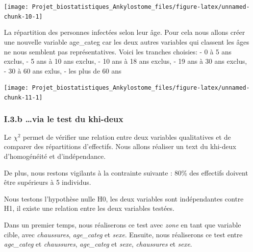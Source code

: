 \documentclass[
]{article}
\begin{document}
\begin{center}\texttt{[image: Projet\_biostatistiques\_Ankylostome\_files/figure-latex/unnamed-chunk-10-1]} \end{center}

La répartition des personnes infectées selon leur âge. Pour cela nous
allons créer une nouvelle variable age\_categ car les deux autres
variables qui classent les âges ne nous semblent pas représentatives.
Voici les tranches choisies: \newline - 0 à 5 ans exclus, \newline - 5
ans à 10 ans exclus, \newline - 10 ans à 18 ans exclus, \newline - 19
ans à 30 ans exclus, \newline - 30 à 60 ans exlus, \newline - les plus
de 60 ans

\begin{center}\texttt{[image: Projet\_biostatistiques\_Ankylostome\_files/figure-latex/unnamed-chunk-11-1]} \end{center}

\subsubsection{I.3.b \ldots via le test du
khi-deux}\label{i.3.b-via-le-test-du-khi-deux}

Le \(\chi^2\) permet de vérifier une relation entre deux variables
qualitatives et de comparer des répartitions d'effectifs. Nous allons
réaliser un text du khi-deux d'homogénéité et d'indépendance.

De plus, nous restons vigilants à la contrainte suivante : 80\% des
effectifs doivent être supérieurs à 5 individus.

Nous testons l'hypothèse nulle H0, les deux variables sont indépendantes
contre H1, il existe une relation entre les deux variables testées.

Dans un premier temps, nous réaliserons ce test avec \emph{zone} en tant
que variable cible, avec \emph{chaussures}, \emph{age\_categ} et
\emph{sexe}. Ensuite, nous réaliserons ce test entre \emph{age\_categ}
et \emph{chaussures}, \emph{age\_categ} et \emph{sexe},
\emph{chaussures} et \emph{sexe}.
\end{document}
